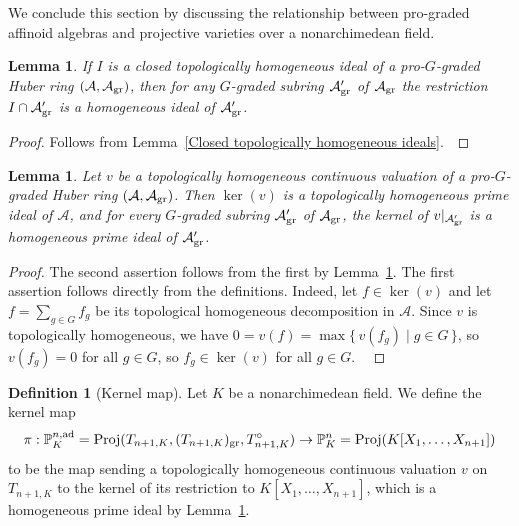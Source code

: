 \documentclass[12pt,twoside,a4paper]{article}
\newtheorem{lemma}[thm]{Lemma}
\theoremstyle{definition}
\newtheorem{mydef}[thm]{Definition}
\theoremstyle{remark}
\newcommand\ad{{\rm ad}}
\newcommand\gr{{\rm gr}}
\newcommand\Proj{{\rm Proj}}
\begin{document}
We conclude this section by discussing the relationship between pro-graded affinoid algebras and projective varieties over a nonarchimedean field. 
\begin{lemma}\label{Restriction of topologically homogeneous ideals}If $I$ is a closed topologically homogeneous ideal of a pro-$G$-graded Huber ring $(\mathcal{A}, \mathcal{A}_{\gr})$, then for any $G$-graded subring $\mathcal{A}_{\gr}^{\prime}$ of $\mathcal{A}_{\gr}$ the restriction $I\cap \mathcal{A}_{\gr}^{\prime}$ is a homogeneous ideal of $\mathcal{A}_{\gr}^{\prime}$.\end{lemma}
\begin{proof}Follows from Lemma~\ref{Closed topologically homogeneous ideals}. \end{proof} 
\begin{lemma}\label{Kernels of topologically homogeneous valuations}Let $v$ be a topologically homogeneous continuous valuation of a pro-$G$-graded Huber ring $(\mathcal{A}, \mathcal{A}_{\gr})$. Then $\ker(v)$ is a topologically homogeneous prime ideal of $\mathcal{A}$, and for every $G$-graded subring $\mathcal{A}_{\gr}^{\prime}$ of $\mathcal{A}_{\gr}$, the kernel of $v\vert_{\mathcal{A}_{\gr}^{\prime}}$ is a homogeneous prime ideal of $\mathcal{A}_{\gr}^{\prime}$.\end{lemma}
\begin{proof}The second assertion follows from the first by Lemma~\ref{Restriction of topologically homogeneous ideals}. The first assertion follows directly from the definitions. Indeed, let $f\in \ker(v)$ and let $f=\sum_{g\in G}f_{g}$ be its topological homogeneous decomposition in $\mathcal{A}$. Since $v$ is topologically homogeneous, we have $0=v(f)=\max\{\, v(f_{g})\mid g\in G\,\}$, so $v(f_{g})=0$ for all $g\in G$, so $f_{g}\in \ker(v)$ for all $g\in G$.  \end{proof}  
\begin{mydef}[Kernel map]\label{Kernel map, definition}Let $K$ be a nonarchimedean field. We define the kernel map \begin{equation*}\pi: \mathbb{P}_{K}^{n,\ad}=\Proj(T_{n+1, K}, (T_{n+1, K})_{\gr}, T_{n+1, K}^{\circ})\to \mathbb{P}_{K}^{n}=\Proj(K[X_1,\dots, X_{n+1}])\end{equation*}to be the map sending a topologically homogeneous continuous valuation $v$ on $T_{n+1, K}$ to the kernel of its restriction to $K[X_1,\dots, X_{n+1}]$, which is a homogeneous prime ideal by Lemma~\ref{Kernels of topologically homogeneous valuations}.\end{mydef}
\end{document}
